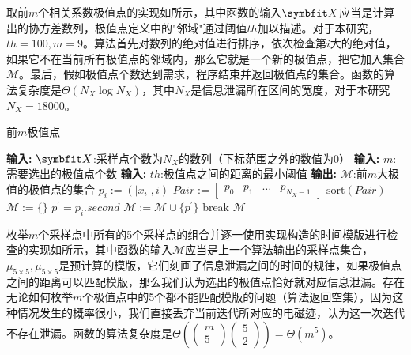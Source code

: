 {	取前$m$个相关系数极值点的实现如所示，其中函数的输入$\Vector X$应当是计算出的协方差数列，极值点定义中的"邻域"通过阈值$th$加以描述。对于本研究，$th=100,m=9$。算法首先对数列的绝对值进行排序，依次检查第$i$大的绝对值，如果它不在当前所有极值点的邻域内，那么它就是一个新的极值点，把它加入集合$\mathcal M$。最后，假如极值点个数达到需求，程序结束并返回极值点的集合。函数的算法复杂度是$\Theta(N_X\log N_X)$，其中$N_X$是信息泄漏所在区间的宽度，对于本研究$N_X=18000$。
	
	\begin{breakablealgorithm}
		\caption{前$m$极值点}\label{alg:maxpoint}
		\begin{algorithmic}[1]
			\Statex \textbf{输入:} $\Vector X$:采样点个数为$N_X$的数列（下标范围之外的数值为0）
			\Statex \textbf{输入:} $m$:需要选出的极值点个数
			\Statex \textbf{输入:} $th$:极值点之间的距离的最小阈值
			\Statex \textbf{输出:} $\mathcal M$:前$m$大极值的极值点的集合
			\State $p_i:=(\vert x_i\vert,i)$
			\EndFor
			\State $Pair:=\begin{bmatrix}p_0&p_1&\ldots&p_{N_X-1}\end{bmatrix}$
			\State $\mathrm{sort}(Pair)$
			\State $\mathcal M:=\{\}$
			\State $p^\prime=p_i.second$
			\State $\mathcal M:=\mathcal M\cup\{p^\prime\}$
			\State break
			\EndIf
			\EndIf
			\EndFor
			\State \Return $\mathcal M$
		\end{algorithmic}
	\end{breakablealgorithm}
	

	枚举$m$个采样点中所有的5个采样点的组合并逐一使用实现构造的时间模版进行检查的实现如所示，其中函数的输入$\mathcal M$应当是上一个算法输出的采样点集合，$\mu_{5\times5},\mu_{5\times5}$是预计算的模版，它们刻画了信息泄漏之间的时间的规律，如果极值点之间的距离可以匹配模版，那么我们认为选出的极值点恰好就对应信息泄漏。存在无论如何枚举$m$个极值点中的5个都不能匹配模版的问题（算法返回空集），因为这种情况发生的概率很小，我们直接丢弃当前迭代所对应的电磁迹，认为这一次迭代不存在泄漏。函数的算法复杂度是$\Theta\left( \begin{pmatrix}m\\5\end{pmatrix}\begin{pmatrix}5\\2\end{pmatrix}\right) =\Theta(m^5)$。
	
}

